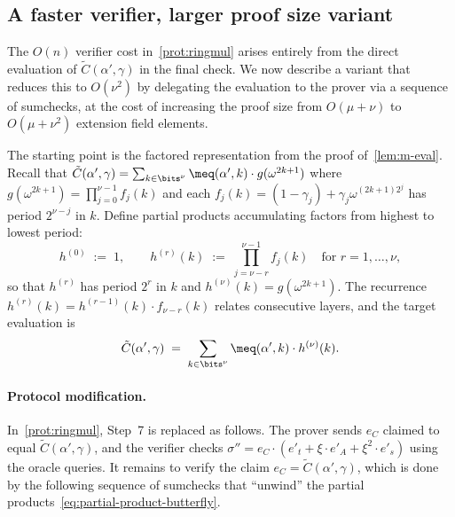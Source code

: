 \subsection{A faster verifier, larger proof size variant}
\label{sec:logger-verifier}

The $O(n)$ verifier cost in~\cref{prot:ringmul} arises entirely from the direct evaluation of $\tilde{C}(\alpha', \gamma)$ in the final check.
We now describe a variant that reduces this to $O(\nu^2)$ by delegating the evaluation to the prover via a sequence of sumchecks, at the cost of increasing the proof size from $O(\mu + \nu)$ to $O(\mu + \nu^2)$ extension field elements.

The starting point is the factored representation from the proof of~\cref{lem:m-eval}.
Recall that $\tilde{C}(\alpha', \gamma) = \sum_{k \in \bits^\nu} \meq(\alpha', k) \cdot g(\omega^{2k+1})$ where $g(\omega^{2k+1}) = \prod_{j=0}^{\nu-1} f_j(k)$ and each $f_j(k) = (1-\gamma_j) + \gamma_j \omega^{(2k+1)2^j}$ has period $2^{\nu-j}$ in $k$.
Define partial products accumulating factors from highest to lowest period:
\begin{equation}\label{eq:partial-product-butterfly}
    h^{(0)} \;:=\; 1, \qquad h^{(r)}(k) \;:=\; \prod_{j=\nu-r}^{\nu-1} f_j(k) \quad \text{for } r = 1, \ldots, \nu,
\end{equation}
so that $h^{(r)}$ has period $2^{r}$ in $k$ and $h^{(\nu)}(k) = g(\omega^{2k+1})$.
The recurrence $h^{(r)}(k) = h^{(r-1)}(k) \cdot f_{\nu-r}(k)$ relates consecutive layers, and the target evaluation is
\begin{equation}\label{eq:target-butterfly}
    \tilde{C}(\alpha', \gamma) \;=\; \sum_{k \in \bits^\nu} \meq(\alpha', k) \cdot h^{(\nu)}(k).
\end{equation}

\paragraph{Protocol modification.} In~\cref{prot:ringmul}, Step~7 is replaced as follows.
The prover sends $e_C$ claimed to equal $\tilde{C}(\alpha', \gamma)$, and the verifier checks $\sigma'' = e_C \cdot (e'_t + \xi \cdot e'_A + \xi^2 \cdot e'_s)$ using the oracle queries.
It remains to verify the claim $e_C = \tilde{C}(\alpha', \gamma)$, which is done by the following sequence of sumchecks that ``unwind'' the partial products~\eqref{eq:partial-product-butterfly}.

